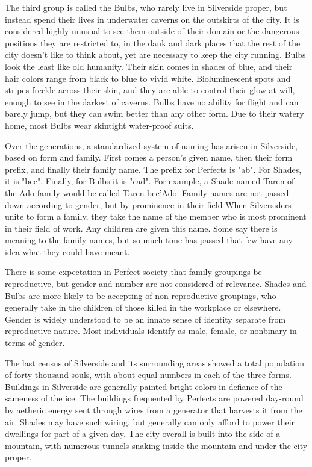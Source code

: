 \documentclass[blue]{Silversiders}
\begin{document}
The third group is called the Bulbs, who rarely live in Silverside proper, but instead spend their lives in underwater caverns on the outskirts of the city. It is considered highly unusual to see them outside of their domain or the dangerous positions they are restricted to, in the dank and dark places that the rest of the city doesn't like to think about, yet are necessary to keep the city running. Bulbs look the least like old humanity. Their skin comes in shades of blue, and their hair colors range from black to blue to vivid white. Bioluminescent spots and stripes freckle across their skin, and they are able to control their glow at will, enough to see in the darkest of caverns. Bulbs have no ability for flight and can barely jump, but they can swim better than any other form. Due to their watery home, most Bulbs wear skintight water-proof suits.

Over the generations, a standardized system of naming has arisen in Silverside, based on form and family. First comes a person's given name, then their form prefix, and finally their family name. The prefix for Perfects is "ab". For Shades, it is "bec". Finally, for Bulbs it is "cad". For example, a Shade named Taren of the Ado family would be called Taren bec'Ado. Family names are not passed down according to gender, but by prominence in their field When Silversiders unite to form a family, they take the name of the member who is most prominent in their field of work. Any children are given this name. Some say there is meaning to the family names, but so much time has passed that few have any idea what they could have meant.

There is some expectation in Perfect society that family groupings be reproductive, but gender and number are not considered of relevance. Shades and Bulbs are more likely to be accepting of non-reproductive groupings, who generally take in the children of those killed in the workplace or elsewhere. Gender is widely understood to be an innate sense of identity separate from reproductive nature. Most individuals identify as male, female, or nonbinary in terms of gender.

The last census of Silverside and its surrounding areas showed a total population of forty thousand souls, with about equal numbers in each of the three forms. Buildings in Silverside are generally painted bright colors in defiance of the sameness of the ice. The buildings frequented by Perfects are powered day-round by aetheric energy sent through wires from a generator that harvests it from the air. Shades may have such wiring, but generally can only afford to power their dwellings for part of a given day. The city overall is built into the side of a mountain, with numerous tunnels snaking inside the mountain and under the city proper.
\end{document}
